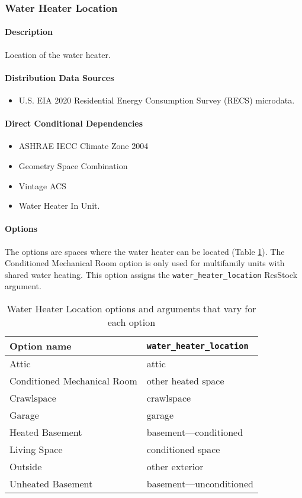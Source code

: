 \subsubsection{Water Heater Location}\label{water_heater_location}
\paragraph{Description}
Location of the water heater.

\paragraph{Distribution Data Sources}
\begin{itemize}
\item
  U.S. EIA 2020 Residential Energy Consumption Survey (RECS) microdata.
\end{itemize}

\paragraph{Direct Conditional Dependencies}
\begin{itemize}
    \item ASHRAE IECC Climate Zone 2004
    \item Geometry Space Combination
    \item Vintage ACS
    \item Water Heater In Unit.
\end{itemize}

\paragraph{Options}
The options are spaces where the water heater can be located (Table \ref{table:hc_opt_water_heater_loc}). The Conditioned Mechanical Room option is only used for multifamily units with shared water heating. This option assigns the \texttt{water\_heater\_location} ResStock argument.

\begin{longtable}[]{ |p{}|p{6cm}| }
\caption{Water Heater Location options and arguments that vary for each option} \label{table:hc_opt_water_heater_loc}  \\
\toprule\noalign{}
Option name & \texttt{water\_heater\_location} \\
\midrule\noalign{}
\endhead
\bottomrule\noalign{}
\endlastfoot
Attic & attic \\
Conditioned Mechanical Room & other heated space \\
Crawlspace & crawlspace \\
Garage & garage \\
Heated Basement & basement---conditioned \\
Living Space  & conditioned space \\
Outside & other exterior \\
Unheated Basement & basement---unconditioned \\
\end{longtable}

